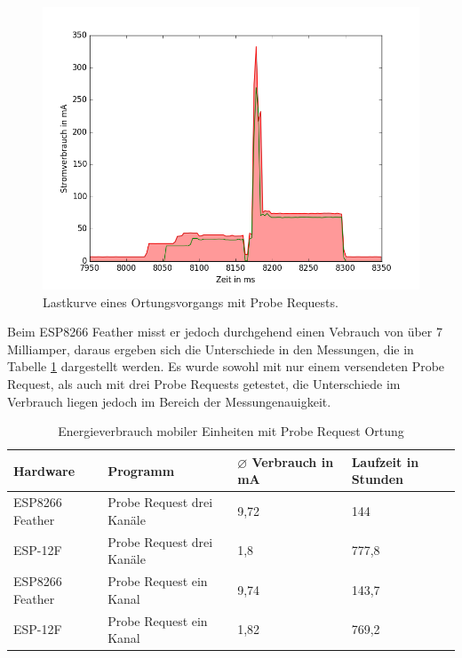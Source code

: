 \begin{figure}[h!]
  \centering
	\includegraphics[width=\textwidth]{plots/probereqv.png}
  \caption{Lastkurve eines Ortungsvorgangs mit Probe Requests.}
  \label{fig:probereqv}
\end{figure}

Beim ESP8266 Feather misst er jedoch durchgehend einen Vebrauch von über 7 Milliamper, daraus ergeben sich die Unterschiede in den Messungen, die in Tabelle \ref{table:probereqina} dargestellt werden.
Es wurde sowohl mit nur einem versendeten Probe Request, als auch mit drei Probe Requests getestet, die Unterschiede im Verbrauch liegen jedoch im Bereich der Messungenauigkeit.

\begin{table}[h!]
	\centering
	\caption{Energieverbrauch mobiler Einheiten mit Probe Request Ortung}
	\label{table:probereqina}
	\begin{tabular}{p{3.5cm}|p{5cm}|p{2.5cm}|p{2.5cm}}
		Hardware & Programm & $\varnothing$ Verbrauch in mA & Laufzeit in Stunden\\
		\hline
		ESP8266 Feather & Probe Request drei Kanäle & 9,72 & 144\\
		ESP-12F & Probe Request drei Kanäle & 1,8 & 777,8\\
		ESP8266 Feather & Probe Request ein Kanal & 9,74 & 143,7\\
		ESP-12F & Probe Request ein Kanal & 1,82 & 769,2\\
	\end{tabular}
\end{table}

